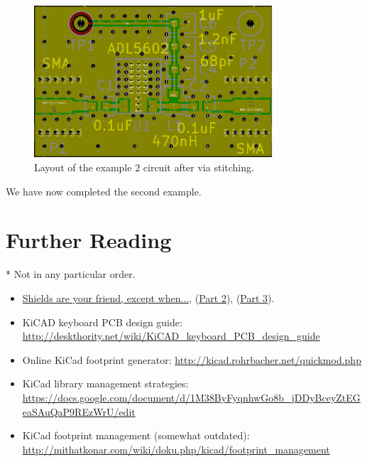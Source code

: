 \documentclass[12pt,letterpaper]{scrartcl}
\begin{document}
\begin{enumerate}
		\begin{figure}[ht]
			\centering
			\includegraphics[width=3.5in]{example2-layout-via}
			\caption{Layout of the example 2 circuit after via stitching.}
			\label{fig:example2-layout-via}
		\end{figure}
		
	\end{enumerate}

We have now completed the second example. 


\newpage
\section{Further Reading}

* Not in any particular order. 

\begin{itemize}
	\item \href{http://www.edn.com/electronics-blogs/the-practicing-instrumentation-engineer/4418080/2/Shields-are-your-friend--except-when-}{Shields are your friend, except when...}, (\href{http://www.edn.com/electronics-blogs/the-practicing-instrumentation-engineer/4419228/2/Shields-are-your-friend--except-when---Part-2-}{Part 2}), (\href{http://www.edn.com/electronics-blogs/the-practicing-instrumentation-engineer/4420553/Shields-are-your-friend--except-when---Part-3-}{Part 3}).
	
	\item KiCAD keyboard PCB design guide: \url{http://deskthority.net/wiki/KiCAD_keyboard_PCB_design_guide}{}

	\item Online KiCad footprint generator: \url{http://kicad.rohrbacher.net/quickmod.php}

	\item KiCad library management strategies: \url{https://docs.google.com/document/d/1M38ByFyqnhwGo8b_jDDyBceyZtEGeaSAuQaP9REzWrU/edit}

	\item KiCad footprint management (somewhat outdated):
\url{http://mithatkonar.com/wiki/doku.php/kicad/footprint_management}

\end{itemize}
\end{document}
